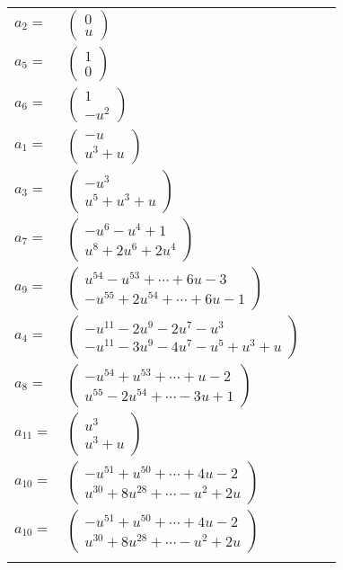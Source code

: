 \documentclass[1p]{elsarticle_modified}
\theoremstyle{definition}
\begin{document}
\begin{tabular}{m{7pt} m{180pt} m{7pt} m{180pt} }
\flushright $a_{2}=$&$\begin{pmatrix}0\\u\end{pmatrix}$ \\
\flushright $a_{5}=$&$\begin{pmatrix}1\\0\end{pmatrix}$ \\
\flushright $a_{6}=$&$\begin{pmatrix}1\\- u^2\end{pmatrix}$ \\
\flushright $a_{1}=$&$\begin{pmatrix}- u\\u^3+u\end{pmatrix}$ \\
\flushright $a_{3}=$&$\begin{pmatrix}- u^3\\u^5+u^3+u\end{pmatrix}$ \\
\flushright $a_{7}=$&$\begin{pmatrix}- u^6- u^4+1\\u^8+2 u^6+2 u^4\end{pmatrix}$ \\
\flushright $a_{9}=$&$\begin{pmatrix}u^{54}- u^{53}+\cdots+6 u-3\\- u^{55}+2 u^{54}+\cdots+6 u-1\end{pmatrix}$ \\
\flushright $a_{4}=$&$\begin{pmatrix}- u^{11}-2 u^9-2 u^7- u^3\\- u^{11}-3 u^9-4 u^7- u^5+u^3+u\end{pmatrix}$ \\
\flushright $a_{8}=$&$\begin{pmatrix}- u^{54}+u^{53}+\cdots+u-2\\u^{55}-2 u^{54}+\cdots-3 u+1\end{pmatrix}$ \\
\flushright $a_{11}=$&$\begin{pmatrix}u^3\\u^3+u\end{pmatrix}$ \\
\flushright $a_{10}=$&$\begin{pmatrix}- u^{51}+u^{50}+\cdots+4 u-2\\u^{30}+8 u^{28}+\cdots- u^2+2 u\end{pmatrix}$\\ \flushright $a_{10}=$&$\begin{pmatrix}- u^{51}+u^{50}+\cdots+4 u-2\\u^{30}+8 u^{28}+\cdots- u^2+2 u\end{pmatrix}$\\&\end{tabular}
\end{document}
